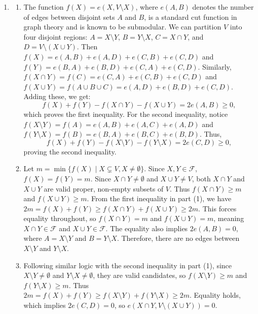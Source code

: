\documentclass{article}
\begin{document}
\begin{enumerate}[label=\fbox{\arabic*}]
  \item %
        \begin{enumerate}[label=(\arabic*)]
          \item The function $f(X) = e(X, V \setminus X)$, where $e(A, B)$ denotes the number of edges between disjoint sets $A$ and $B$, is a standard cut function in graph theory and is known to be submodular.
                We can partition $V$ into four disjoint regions: $A = X \setminus Y$, $B = Y \setminus X$, $C = X \cap Y$, and $D = V \setminus (X \cup Y)$.
                Then $f(X) = e(A, B) + e(A, D) + e(C, B) + e(C, D)$ and $f(Y) = e(B, A) + e(B, D) + e(C, A) + e(C, D)$.
                Similarly, $f(X \cap Y) = f(C) = e(C, A) + e(C, B) + e(C, D)$ and $f(X \cup Y) = f(A \cup B \cup C) = e(A, D) + e(B, D) + e(C, D)$.
                Adding these, we get:
                \[
                  f(X) + f(Y) - f(X \cap Y) - f(X \cup Y) = 2e(A, B) \ge 0,
                \]
                which proves the first inequality.
                For the second inequality, notice $f(X \setminus Y) = f(A) = e(A, B) + e(A, C) + e(A, D)$ and $f(Y \setminus X) = f(B) = e(B, A) + e(B, C) + e(B, D)$.
                Thus,
                \[
                  f(X) + f(Y) - f(X \setminus Y) - f(Y \setminus X) = 2e(C, D) \ge 0,
                \]
                proving the second inequality.
          \item Let $m = \min \{ f(X) \mid X \subsetneq V, X \neq \emptyset \}$. Since $X, Y \in \mathcal{F}$, $f(X) = f(Y) = m$.
                Since $X \cap Y \neq \emptyset$ and $X \cup Y \neq V$, both $X \cap Y$ and $X \cup Y$ are valid proper, non-empty subsets of $V$. Thus $f(X \cap Y) \ge m$ and $f(X \cup Y) \ge m$.
                From the first inequality in part (1), we have $2m = f(X) + f(Y) \ge f(X \cap Y) + f(X \cup Y) \ge 2m$.
                This forces equality throughout, so $f(X \cap Y) = m$ and $f(X \cup Y) = m$, meaning $X \cap Y \in \mathcal{F}$ and $X \cup Y \in \mathcal{F}$.
                The equality also implies $2e(A, B) = 0$, where $A = X \setminus Y$ and $B = Y \setminus X$. Therefore, there are no edges between $X \setminus Y$ and $Y \setminus X$.
          \item Following similar logic with the second inequality in part (1), since $X \setminus Y \neq \emptyset$ and $Y \setminus X \neq \emptyset$, they are valid candidates, so $f(X \setminus Y) \ge m$ and $f(Y \setminus X) \ge m$.
                Thus $2m = f(X) + f(Y) \ge f(X \setminus Y) + f(Y \setminus X) \ge 2m$.
                Equality holds, which implies $2e(C, D) = 0$, so $e(X \cap Y, V \setminus (X \cup Y)) = 0$.

\end{enumerate}
\end{enumerate}
\end{document}
